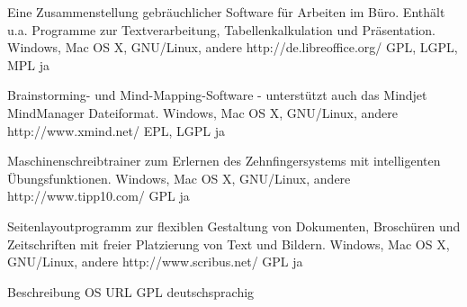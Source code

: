 \documentclass[11pt,a4paper,landscape,twocolumn]{article}
\begin{document}


{Eine Zusammenstellung gebräuchlicher Software für Arbeiten im Büro. Enthält u.a. Programme zur Textverarbeitung, Tabellenkalkulation und Präsentation.}
{Windows, Mac OS X, GNU/Linux, andere}
{http://de.libreoffice.org/}
{GPL, LGPL, MPL}
{ja}

{Brainstorming- und Mind-Mapping-Software - unterstützt auch das Mindjet MindManager Dateiformat.}
{Windows, Mac OS X, GNU/Linux, andere}
{http://www.xmind.net/}
{EPL, LGPL}
{ja}

{Maschinenschreibtrainer zum Erlernen des Zehnfingersystems mit intelligenten Übungsfunktionen.}
{Windows, Mac OS X, GNU/Linux, andere}
{http://www.tipp10.com/}
{GPL}
{ja}

{Seitenlayoutprogramm zur flexiblen Gestaltung von Dokumenten, Broschüren und Zeitschriften mit freier Platzierung von Text und Bildern.}
{Windows, Mac OS X, GNU/Linux, andere}
{http://www.scribus.net/}
{GPL}
{ja}


\newpage %


{Beschreibung}
{OS}
{URL}
{GPL}
{deutschsprachig}
\end{document}
